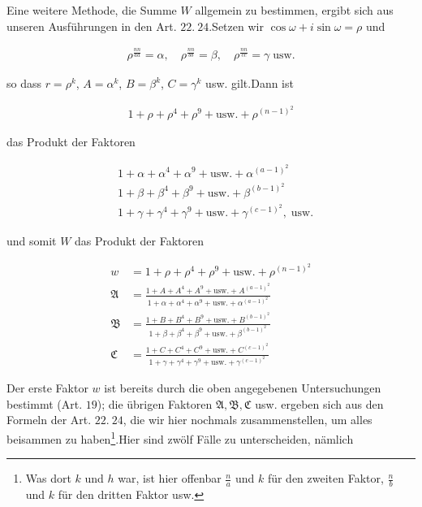 
Eine weitere Methode, die Summe $W$ allgemein zu bestimmen, ergibt sich aus unseren Ausführungen in den Art. $22.\ 24$.\quad Setzen wir $\cos\omega+i\sin\omega=\rho$ und

\[
\begin{aligned}
\rho^{\frac{nn}{aa}}=\alpha,\quad\rho^{\frac{nn}{bb}}=\beta,\quad\rho^{\frac{nn}{cc}}=\gamma\;\text{usw.}
\end{aligned}
\]

so dass $r=\rho^k$, $A=\alpha^k$, $B=\beta^k$, $C=\gamma^k$ usw. gilt.\quad Dann ist

\[
\begin{aligned}
1+\rho+\rho^4+\rho^9+\text{usw.}+\rho^{(n-1)^2}
\end{aligned}
\]

das Produkt der Faktoren

\[
\begin{aligned}
&1+\alpha+\alpha^4+\alpha^9+\text{usw.}+\alpha^{(a-1)^2}\\
&1+\beta+\beta^4+\beta^9+\text{usw.}+\beta^{(b-1)^2}\\
&1+\gamma+\gamma^4+\gamma^9+\text{usw.}+\gamma^{(c-1)^2},\;\text{usw.}
\end{aligned}
\]


und somit $W$ das Produkt der Faktoren

\[
\begin{aligned}
w&=1+\rho+\rho^4+\rho^9+\text{usw.}+\rho^{(n-1)^2}\\[2pt]
\mathfrak A&=\frac{1+A+A^4+A^9+\text{usw.}+A^{(a-1)^2}}{1+\alpha+\alpha^4+\alpha^9+\text{usw.}+\alpha^{(a-1)^2}}\\[2pt]
\mathfrak B&=\frac{1+B+B^4+B^9+\text{usw.}+B^{(b-1)^2}}{1+\beta+\beta^4+\beta^9+\text{usw.}+\beta^{(b-1)^2}}\\[2pt]
\mathfrak C&=\frac{1+C+C^4+C^9+\text{usw.}+C^{(c-1)^2}}{1+\gamma+\gamma^4+\gamma^9+\text{usw.}+\gamma^{(c-1)^2}}
\end{aligned}
\]

Der erste Faktor $w$ ist bereits durch die oben angegebenen Untersuchungen bestimmt (Art. $19$); die übrigen Faktoren $\mathfrak A,\mathfrak B,\mathfrak C$ usw. ergeben sich aus den Formeln der Art. $22.\ 24$, die wir hier nochmals zusammenstellen, um alles beisammen zu haben\begingroup\renewcommand{\thefootnote}{*)}\footnote{Was dort $k$ und $h$ war, ist hier offenbar $\frac{n}{a}$ und $k$ für den zweiten Faktor, $\frac{n}{b}$ und $k$ für den dritten Faktor usw.}\endgroup.\quad Hier sind zwölf Fälle zu unterscheiden, nämlich


